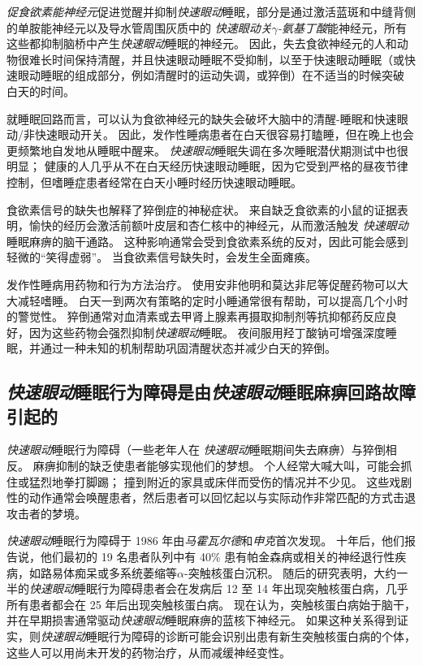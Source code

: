 \textit{促食欲素能神经元}促进觉醒并抑制\textit{快速眼动}睡眠，部分是通过激活蓝斑和中缝背侧的单胺能神经元以及导水管周围灰质中的 \textit{快速眼动关}\textit{$\gamma$-氨基丁酸}能神经元，所有这些都抑制脑桥中产生\textit{快速眼动}睡眠的神经元。
因此，失去食欲神经元的人和动物很难长时间保持清醒，并且快速眼动睡眠不受抑制，以至于快速眼动睡眠（或快速眼动睡眠的组成部分，例如清醒时的运动失调，或猝倒）在不适当的时候突破 白天的时间。


就睡眠回路而言，可以认为食欲神经元的缺失会破坏大脑中的清醒-睡眠和快速眼动/非快速眼动开关。
因此，发作性睡病患者在白天很容易打瞌睡，但在晚上也会更频繁地自发地从睡眠中醒来。
\textit{快速眼动}睡眠失调在多次睡眠潜伏期测试中也很明显；
健康的人几乎从不在白天经历快速眼动睡眠，因为它受到严格的昼夜节律控制，但嗜睡症患者经常在白天小睡时经历快速眼动睡眠。


食欲素信号的缺失也解释了猝倒症的神秘症状。
来自缺乏食欲素的小鼠的证据表明，愉快的经历会激活前额叶皮层和杏仁核中的神经元，从而激活触发 \textit{快速眼动}睡眠麻痹的脑干通路。
这种影响通常会受到食欲素系统的反对，因此可能会感到轻微的“笑得虚弱”。
当食欲素信号缺失时，会发生全面瘫痪。


发作性睡病用药物和行为方法治疗。
使用安非他明和莫达非尼等促醒药物可以大大减轻嗜睡。
白天一到两次有策略的定时小睡通常很有帮助，可以提高几个小时的警觉性。
猝倒通常对血清素或去甲肾上腺素再摄取抑制剂等抗抑郁药反应良好，因为这些药物会强烈抑制\textit{快速眼动}睡眠。
夜间服用羟丁酸钠可增强深度睡眠，并通过一种未知的机制帮助巩固清醒状态并减少白天的猝倒。



\subsection{\textit{快速眼动}睡眠行为障碍是由\textit{快速眼动}睡眠麻痹回路故障引起的}

\textit{快速眼动}睡眠行为障碍（一些老年人在 \textit{快速眼动}睡眠期间失去麻痹）与猝倒相反。
麻痹抑制的缺乏使患者能够实现他们的梦想。
个人经常大喊大叫，可能会抓住或猛烈地拳打脚踢；
撞到附近的家具或床伴而受伤的情况并不少见。
这些戏剧性的动作通常会唤醒患者，然后患者可以回忆起以与实际动作非常匹配的方式击退攻击者的梦境。


\textit{快速眼动}睡眠行为障碍于 1986 年由\textit{马霍瓦尔德}和\textit{申克}首次发现。
十年后，他们报告说，他们最初的 19 名患者队列中有 40\% 患有帕金森病或相关的神经退行性疾病，如路易体痴呆或多系统萎缩等$ \alpha $-突触核蛋白沉积。
随后的研究表明，大约一半的\textit{快速眼动}睡眠行为障碍患者会在发病后 12 至 14 年出现突触核蛋白病，几乎所有患者都会在 25 年后出现突触核蛋白病。
现在认为，突触核蛋白病始于脑干，并在早期损害通常驱动\textit{快速眼动}睡眠麻痹的蓝核下神经元。
如果这种关系得到证实，则\textit{快速眼动}睡眠行为障碍的诊断可能会识别出患有新生突触核蛋白病的个体，这些人可以用尚未开发的药物治疗，从而减缓神经变性。



